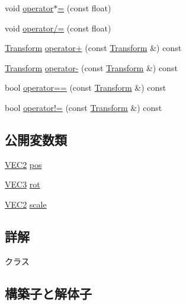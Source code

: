 \begin{DoxyCompactItemize}
\item 
void \mbox{\hyperlink{class_transform_ab13378f63abf5bc132841f83423a634d}{operator$\ast$=}} (const float)
\item 
void \mbox{\hyperlink{class_transform_aa38455bbe5aed5f9dfd98a8d3b8a24ec}{operator/=}} (const float)
\item 
\mbox{\hyperlink{class_transform}{Transform}} \mbox{\hyperlink{class_transform_a8e21c258146adde8ca798878bab9ce9d}{operator+}} (const \mbox{\hyperlink{class_transform}{Transform}} \&) const
\item 
\mbox{\hyperlink{class_transform}{Transform}} \mbox{\hyperlink{class_transform_a17493155309aa1650de99ce384f096a6}{operator-\/}} (const \mbox{\hyperlink{class_transform}{Transform}} \&) const
\item 
bool \mbox{\hyperlink{class_transform_a0a2d49f8c1b9a2229846534f9bcc63d4}{operator==}} (const \mbox{\hyperlink{class_transform}{Transform}} \&) const
\item 
bool \mbox{\hyperlink{class_transform_ae0aed78dcd6aaeb786ec0bdadafa9498}{operator!=}} (const \mbox{\hyperlink{class_transform}{Transform}} \&) const
\end{DoxyCompactItemize}
\subsection*{公開変数類}
\begin{DoxyCompactItemize}
\item 
\mbox{\hyperlink{transform_8h_afb0c5e21d4133ff4f200992c0b534e1b}{V\+E\+C2}} \mbox{\hyperlink{class_transform_a25bce2389cc280e8adf193bdbb00d94a}{pos}}
\item 
\mbox{\hyperlink{transform_8h_a7e10f09694869ec22cb183f13a59289c}{V\+E\+C3}} \mbox{\hyperlink{class_transform_a37866af878aeb2fd7b30a375d2227e68}{rot}}
\item 
\mbox{\hyperlink{transform_8h_afb0c5e21d4133ff4f200992c0b534e1b}{V\+E\+C2}} \mbox{\hyperlink{class_transform_a5dbda48cf294803797eccb79d1f833b7}{scale}}
\end{DoxyCompactItemize}


\subsection{詳解}
クラス 

\subsection{構築子と解体子}
\mbox{\label{class_transform_aa08ca4266efabc768973cdeea51945ab}} 
